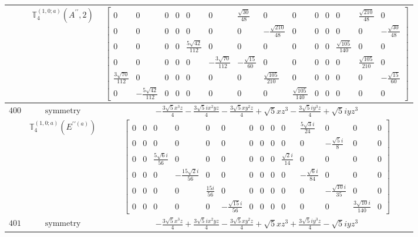 \documentclass[fleqn,8pt,landscape]{jsarticle}
\begin{document}
\begin{longtable}{ccc}
$  $ & $ \mathbb{T}_{4}^{(1,0;a)}(A^{\prime\prime},2) $ & $ \begin{bmatrix} 0 & 0 & 0 & 0 & 0 & 0 & \frac{\sqrt{30}}{48} & 0 & 0 & 0 & 0 & 0 & \frac{\sqrt{210}}{48} & 0 \\ 0 & 0 & 0 & 0 & 0 & 0 & 0 & - \frac{\sqrt{210}}{48} & 0 & 0 & 0 & 0 & 0 & - \frac{\sqrt{30}}{48} \\ 0 & 0 & 0 & 0 & \frac{5 \sqrt{42}}{112} & 0 & 0 & 0 & 0 & 0 & 0 & \frac{\sqrt{105}}{140} & 0 & 0 \\ 0 & 0 & 0 & 0 & 0 & - \frac{3 \sqrt{70}}{112} & - \frac{\sqrt{15}}{60} & 0 & 0 & 0 & 0 & 0 & \frac{\sqrt{105}}{210} & 0 \\ \frac{3 \sqrt{70}}{112} & 0 & 0 & 0 & 0 & 0 & 0 & \frac{\sqrt{105}}{210} & 0 & 0 & 0 & 0 & 0 & - \frac{\sqrt{15}}{60} \\ 0 & - \frac{5 \sqrt{42}}{112} & 0 & 0 & 0 & 0 & 0 & 0 & \frac{\sqrt{105}}{140} & 0 & 0 & 0 & 0 & 0 \end{bmatrix} $ \\ \hline
$ 400 $ & $ \text{symmetry} $ & $ - \frac{3 \sqrt{5} x^{3} z}{4} - \frac{3 \sqrt{5} i x^{2} y z}{4} - \frac{3 \sqrt{5} x y^{2} z}{4} + \sqrt{5} x z^{3} - \frac{3 \sqrt{5} i y^{3} z}{4} + \sqrt{5} i y z^{3} $ \\
$  $ & $ \mathbb{T}_{4}^{(1,0;a)}(E^{\prime\prime(a)}) $ & $ \begin{bmatrix} 0 & 0 & 0 & 0 & 0 & 0 & 0 & 0 & 0 & 0 & \frac{5 \sqrt{3} i}{24} & 0 & 0 & 0 \\ 0 & 0 & 0 & 0 & 0 & 0 & 0 & 0 & 0 & 0 & 0 & - \frac{\sqrt{5} i}{8} & 0 & 0 \\ 0 & 0 & \frac{5 \sqrt{6} i}{56} & 0 & 0 & 0 & 0 & 0 & 0 & \frac{\sqrt{2} i}{14} & 0 & 0 & 0 & 0 \\ 0 & 0 & 0 & - \frac{15 \sqrt{2} i}{56} & 0 & 0 & 0 & 0 & 0 & 0 & - \frac{\sqrt{6} i}{84} & 0 & 0 & 0 \\ 0 & 0 & 0 & 0 & \frac{15 i}{56} & 0 & 0 & 0 & 0 & 0 & 0 & - \frac{\sqrt{10} i}{35} & 0 & 0 \\ 0 & 0 & 0 & 0 & 0 & - \frac{\sqrt{15} i}{56} & 0 & 0 & 0 & 0 & 0 & 0 & \frac{3 \sqrt{10} i}{140} & 0 \end{bmatrix} $ \\ \hline
$ 401 $ & $ \text{symmetry} $ & $ - \frac{3 \sqrt{5} x^{3} z}{4} + \frac{3 \sqrt{5} i x^{2} y z}{4} - \frac{3 \sqrt{5} x y^{2} z}{4} + \sqrt{5} x z^{3} + \frac{3 \sqrt{5} i y^{3} z}{4} - \sqrt{5} i y z^{3} $ \\

\end{longtable}
\end{document}
